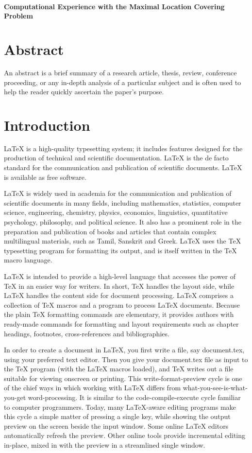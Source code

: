 \documentclass[11pt, a4paper]{article}
\newcommand{\Title}[1]{{\LARGE \centering \hrulefill\\ \textbf{#1}\\ \hrulefill}}
\begin{document}
\pagestyle{plain}


\onehalfspacing
\setcounter{page}{1}
\Title{Computational Experience with the Maximal Location Covering Problem}

\section*{Abstract}
{\small \singlespacing
	An abstract is a brief summary of a research article, thesis, review, conference proceeding,	or any in-depth analysis of a particular subject and is often used to help the reader quickly ascertain the paper's purpose.
}

\section{Introduction}\label{sec:intro}
LaTeX is a high-quality typesetting system; it includes features designed for the production of technical and scientific documentation. LaTeX is the de facto standard for the communication and publication of scientific documents. LaTeX is available as free software.

LaTeX is widely used in academia for the communication and publication of scientific documents in many fields, including mathematics, statistics, computer science, engineering, chemistry, physics, economics, linguistics, quantitative psychology, philosophy, and political science. It also has a prominent role in the preparation and publication of books and articles that contain complex multilingual materials, such as Tamil, Sanskrit and Greek. LaTeX uses the TeX typesetting program for formatting its output, and is itself written in the TeX macro language.

LaTeX is intended to provide a high-level language that accesses the power of TeX in an easier way for writers. In short, TeX handles the layout side, while LaTeX handles the content side for document processing. LaTeX comprises a collection of TeX macros and a program to process LaTeX documents. Because the plain TeX formatting commands are elementary, it provides authors with ready-made commands for formatting and layout requirements such as chapter headings, footnotes, cross-references and bibliographies.

In order to create a document in LaTeX, you first write a file, say document.tex, using your preferred text editor. Then you give your document.tex file as input to the TeX program (with the LaTeX macros loaded), and TeX writes out a file suitable for viewing onscreen or printing. This write-format-preview cycle is one of the chief ways in which working with LaTeX differs from what-you-see-is-what-you-get word-processing. It is similar to the code-compile-execute cycle familiar to computer programmers. Today, many LaTeX-aware editing programs make this cycle a simple matter of pressing a single key, while showing the output preview on the screen beside the input window. Some online LaTeX editors automatically refresh the preview. Other online tools provide incremental editing in-place, mixed in with the preview in a streamlined single window.
\end{document}
